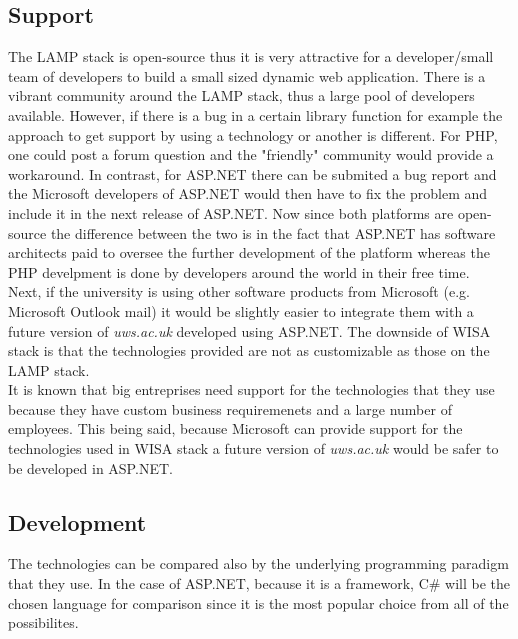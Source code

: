 \documentclass[11]{article}
\begin{document}
	\subsection{Support}
		The LAMP stack  is open-source thus it is very attractive for a developer/small team of developers to build a small sized dynamic web application. There is a vibrant community around the LAMP stack, thus a large pool of developers available. However, if there is a bug in a certain library function for example the approach to get support by using a technology or another is different. For PHP, one could post a forum question and the "friendly" community would provide a workaround. In contrast, for ASP.NET there can be submited a bug report and the Microsoft developers of ASP.NET would then have to fix the problem and include it in the next release of ASP.NET. Now since both platforms are open-source the difference between the two is in the fact that ASP.NET has software architects  paid to oversee the further development of the platform whereas the PHP develpment is done by developers around the world in their free time.\\
	\indent
	Next, if the university is using other software products from Microsoft (e.g. Microsoft Outlook mail) it would be slightly easier to integrate them with a future version of \textit{uws.ac.uk} developed using ASP.NET. The downside of WISA stack is that the technologies provided are not as customizable as those on the LAMP stack.\\
	
	\indent
	It is known that big entreprises need support for the technologies that they use because they have custom business requiremenets and a large number of employees. This being said, because Microsoft can provide support for the technologies used in WISA stack a future version of \textit{uws.ac.uk} would be safer to be developed in ASP.NET.\\

	\subsection{Development}
	The technologies can be compared also by the underlying programming paradigm that they use. In the case of ASP.NET, because it is a framework, C\# will be the chosen language for comparison since it is the most popular choice from all of the possibilites. \\
	
\end{document}

